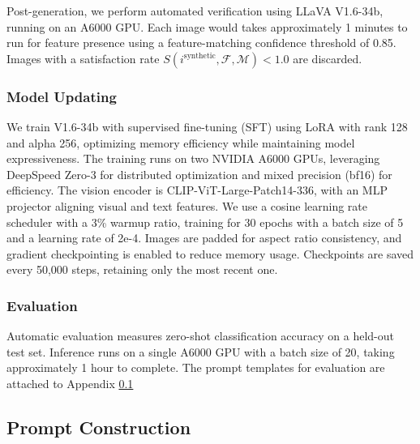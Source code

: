 Post-generation, we perform automated verification using LLaVA V1.6-34b, running on an A6000 GPU. Each image would takes approximately 1 minutes to run for feature presence using a feature-matching confidence threshold of 0.85. Images with a satisfaction rate $S(i^{\text{synthetic}}, \mathcal{F}, \mathcal{M}) < 1.0$ are discarded.

\subsubsection{Model Updating}

We train V1.6-34b with supervised fine-tuning (SFT) using LoRA with rank 128 and alpha 256, optimizing memory efficiency while maintaining model expressiveness. The training runs on two NVIDIA A6000 GPUs, leveraging DeepSpeed Zero-3 for distributed optimization and mixed precision (bf16) for efficiency. The vision encoder is CLIP-ViT-Large-Patch14-336, with an MLP projector aligning visual and text features. We use a cosine learning rate scheduler with a 3\% warmup ratio, training for 30 epochs with a batch size of 5 and a learning rate of 2e-4. Images are padded for aspect ratio consistency, and gradient checkpointing is enabled to reduce memory usage. Checkpoints are saved every 50,000 steps, retaining only the most recent one.

\subsubsection{Evaluation}

Automatic evaluation measures zero-shot classification accuracy on a held-out test set. Inference runs on a single A6000 GPU with a batch size of 20, taking approximately 1 hour to complete. The prompt templates for evaluation are attached to Appendix \ref{app:prompt}


\subsection{Prompt Construction}
\label{app:prompt}







